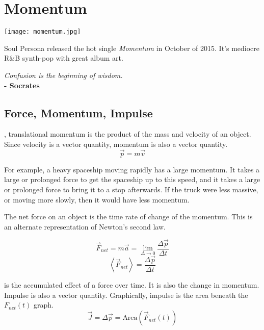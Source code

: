 \chapter{Momentum}

\begin{marginfigure}%
  \texttt{[image: momentum.jpg]}
  \caption{Soul Persona released the hot single \textit{Momentum} in October of 2015.  It's mediocre R\&B synth-pop with great album art.}
  \label{fig:marginfig}
\end{marginfigure}
\textit{Confusion is the beginning of wisdom.}  \\
\noindent\textbf{-   Socrates}


\section{Force, Momentum, Impulse}

, translational momentum is the product of the mass and velocity of an object.  Since velocity is a vector quantity, momentum is also a vector quantity.
$$\overrightarrow{p}=m\overrightarrow{v}$$

For example, a heavy spaceship moving rapidly has a large momentum.  It takes a large or prolonged force to get the spaceship up to this speed, and it takes a large or prolonged force to bring it to a stop afterwards. If the truck were less massive, or moving more slowly, then it would have less momentum.


\vspace{1cm}

The net force on an object is the time rate of change of the momentum.  This is an alternate representation of Newton's second law.

$$\overrightarrow{F}_{net}=m\overrightarrow{a}=\lim_{\Delta \rightarrow 0}\frac{\Delta \overrightarrow{p}}{\Delta t}$$
$$\left<\overrightarrow{F}_{net}\right>=\frac{\Delta\overrightarrow{p}}{\Delta t}$$

 is the accumulated effect of a force over time.  It is also the change in momentum.  Impulse is also a vector quantity.  Graphically, impulse is the area beneath the $F_{net}(t)$ graph.
$$\overrightarrow{J}=\Delta \overrightarrow{p}=\text{Area}\left( \overrightarrow{F}_{net}(t)\right)$$



